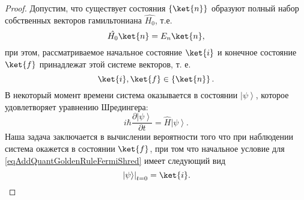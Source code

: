 \begin{proof}
  Допустим, что существует состояния
  $\left\{\ket{n}\right\}$ образуют полный набор собственных
  векторов гамильтониана $\hat{H_0}$, т.е.
  \begin{equation}
    \hat{H_0} \ket{ n } = E_n \ket{ n },
    \nonumber
  \end{equation}
  при этом, рассматриваемое начальное состояние  $\ket{i}$ и
  конечное состояние $\ket{f}$ принадлежат этой системе
  векторов, т. е.
  \begin{equation}
    \ket{i}, \ket{f} \in \left\{\ket{n}\right\}.
    \nonumber
  \end{equation}
  В некоторый момент времени система оказывается в состоянии
  $\left|\psi\right>$, которое удовлетворяет уравнению Шредингера:
  \begin{equation}
    i \hbar \frac{\partial \left|\psi\right>}{\partial t} =
    \hat{H} \left|\psi\right>.
    \label{eqAddQuantGoldenRuleFermiShred}
  \end{equation}
  Наша задача заключается в вычислении вероятности того что при
  наблюдении система окажется в состоянии $\ket{f}$, при том
  что начальное условие для \eqref{eqAddQuantGoldenRuleFermiShred}
  имеет следующий вид
  \begin{equation}
    \left.\left|\psi\right>\right|_{t=0} = \ket{i}.
    \label{eqAddQuantGoldenRuleFermiInitialCond}
  \end{equation}


\end{proof}
